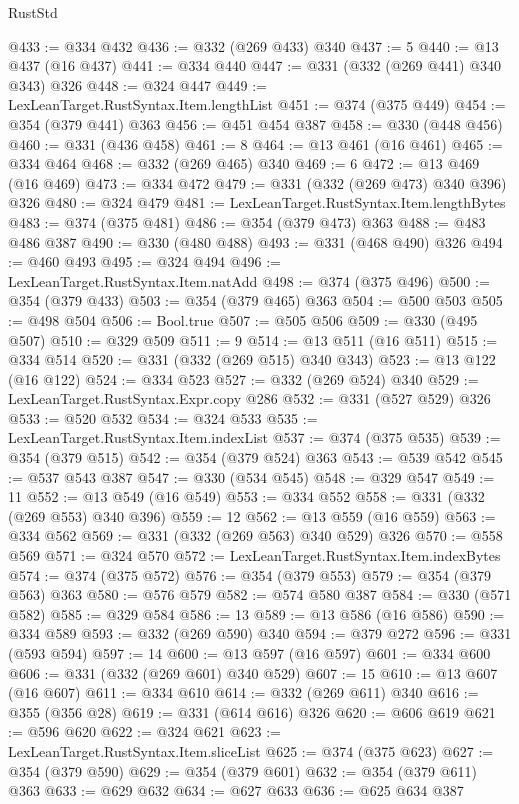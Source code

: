 \begin{lexlean}{RustStd}
\begin{coremodule}
@433 := @334 @432
@436 := @332 (@269 @433) @340
@437 := 5
@440 := @13 @437 (@16 @437)
@441 := @334 @440
@447 := @331 (@332 (@269 @441) @340 @343) @326
@448 := @324 @447
@449 := LexLeanTarget.RustSyntax.Item.lengthList
@451 := @374 (@375 @449)
@454 := @354 (@379 @441) @363
@456 := @451 @454 @387
@458 := @330 (@448 @456)
@460 := @331 (@436 @458)
@461 := 8
@464 := @13 @461 (@16 @461)
@465 := @334 @464
@468 := @332 (@269 @465) @340
@469 := 6
@472 := @13 @469 (@16 @469)
@473 := @334 @472
@479 := @331 (@332 (@269 @473) @340 @396) @326
@480 := @324 @479
@481 := LexLeanTarget.RustSyntax.Item.lengthBytes
@483 := @374 (@375 @481)
@486 := @354 (@379 @473) @363
@488 := @483 @486 @387
@490 := @330 (@480 @488)
@493 := @331 (@468 @490) @326
@494 := @460 @493
@495 := @324 @494
@496 := LexLeanTarget.RustSyntax.Item.natAdd
@498 := @374 (@375 @496)
@500 := @354 (@379 @433)
@503 := @354 (@379 @465) @363
@504 := @500 @503
@505 := @498 @504
@506 := Bool.true
@507 := @505 @506
@509 := @330 (@495 @507)
@510 := @329 @509
@511 := 9
@514 := @13 @511 (@16 @511)
@515 := @334 @514
@520 := @331 (@332 (@269 @515) @340 @343)
@523 := @13 @122 (@16 @122)
@524 := @334 @523
@527 := @332 (@269 @524) @340
@529 := LexLeanTarget.RustSyntax.Expr.copy @286
@532 := @331 (@527 @529) @326
@533 := @520 @532
@534 := @324 @533
@535 := LexLeanTarget.RustSyntax.Item.indexList
@537 := @374 (@375 @535)
@539 := @354 (@379 @515)
@542 := @354 (@379 @524) @363
@543 := @539 @542
@545 := @537 @543 @387
@547 := @330 (@534 @545)
@548 := @329 @547
@549 := 11
@552 := @13 @549 (@16 @549)
@553 := @334 @552
@558 := @331 (@332 (@269 @553) @340 @396)
@559 := 12
@562 := @13 @559 (@16 @559)
@563 := @334 @562
@569 := @331 (@332 (@269 @563) @340 @529) @326
@570 := @558 @569
@571 := @324 @570
@572 := LexLeanTarget.RustSyntax.Item.indexBytes
@574 := @374 (@375 @572)
@576 := @354 (@379 @553)
@579 := @354 (@379 @563) @363
@580 := @576 @579
@582 := @574 @580 @387
@584 := @330 (@571 @582)
@585 := @329 @584
@586 := 13
@589 := @13 @586 (@16 @586)
@590 := @334 @589
@593 := @332 (@269 @590) @340
@594 := @379 @272
@596 := @331 (@593 @594)
@597 := 14
@600 := @13 @597 (@16 @597)
@601 := @334 @600
@606 := @331 (@332 (@269 @601) @340 @529)
@607 := 15
@610 := @13 @607 (@16 @607)
@611 := @334 @610
@614 := @332 (@269 @611) @340
@616 := @355 (@356 @28)
@619 := @331 (@614 @616) @326
@620 := @606 @619
@621 := @596 @620
@622 := @324 @621
@623 := LexLeanTarget.RustSyntax.Item.sliceList
@625 := @374 (@375 @623)
@627 := @354 (@379 @590)
@629 := @354 (@379 @601)
@632 := @354 (@379 @611) @363
@633 := @629 @632
@634 := @627 @633
@636 := @625 @634 @387

\end{coremodule}
\end{lexlean}
